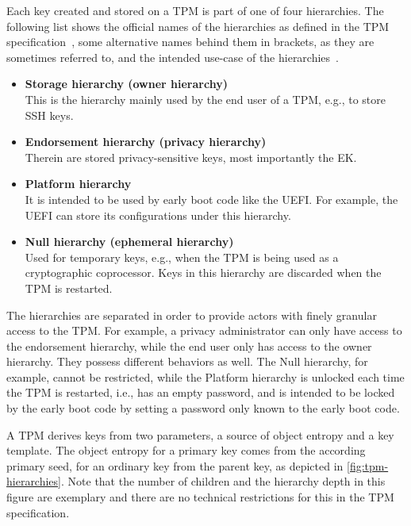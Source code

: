 Each key created and stored on a TPM is part of one of four hierarchies.
The following list shows the official names of the hierarchies as defined in the TPM specification~\cite{tpm}, some alternative names behind them in brackets, as they are sometimes referred to, and the intended use-case of the hierarchies~\cite{Arthur2015}.
\begin{itemize}

  \item{\textbf{Storage hierarchy (owner hierarchy)}\\
  This is the hierarchy mainly used by the end user of a TPM, e.g., to store SSH keys.}

  \item{\textbf{Endorsement hierarchy (privacy hierarchy)}\\
  Therein are stored privacy-sensitive keys, most importantly the EK.}

  \item{\textbf{Platform hierarchy}\\
  It is intended to be used by early boot code like the UEFI\@.
  For example, the UEFI can store its configurations under this hierarchy.}

  \item{\textbf{Null hierarchy (ephemeral hierarchy)}\\
  Used for temporary keys, e.g., when the TPM is being used as a cryptographic coprocessor.
  Keys in this hierarchy are discarded when the TPM is restarted.}

\end{itemize}


The hierarchies are separated in order to provide actors with finely granular access to the TPM\@.
For example, a privacy administrator can only have access to the endorsement hierarchy, while the end user only has access to the owner hierarchy.
They possess different behaviors as well.
The Null hierarchy, for example, cannot be restricted, while the Platform hierarchy is unlocked each time the TPM is restarted, i.e., has an empty password, and is intended to be locked by the early boot code by setting a password only known to the early boot code.



A TPM derives keys from two parameters, a source of object entropy and a key template.
The object entropy for a primary key comes from the according primary seed, for an ordinary key from the parent key, as depicted in \autoref{fig:tpm-hierarchies}.
Note that the number of children and the hierarchy depth in this figure are exemplary and there are no technical restrictions for this in the TPM specification.

